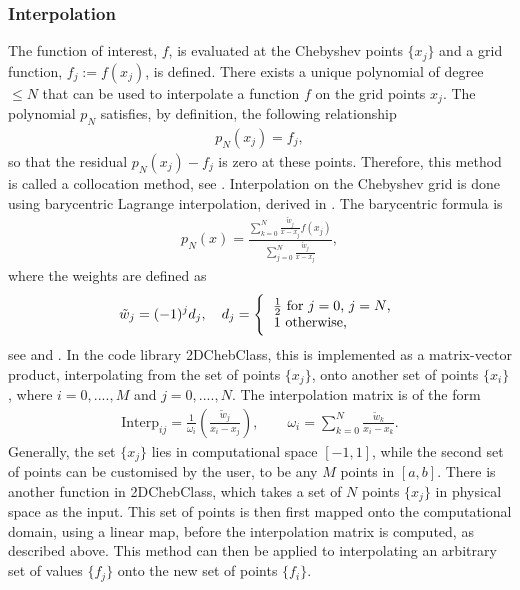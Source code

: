 \documentclass[11pt, a4paper]{article}
\theoremstyle{definition}
\begin{document}
\subsubsection{Interpolation}
The function of interest, $f$, is evaluated at the Chebyshev points $\{x_j\}$ and a grid function, $f_j := f(x_j)$, is defined. There exists a unique polynomial of degree $\leq N$ that can be used to interpolate a function $f$ on the grid points $x_j$. The polynomial $p_N$ satisfies, by definition, the following relationship
\begin{align}\label{eqnptov1}
	p_N(x_j)=f_j,
\end{align}
so that the residual $p_N(x_j) -f_j$ is zero at these points. Therefore, this method is called a collocation method, see \cite{Boyd1}. Interpolation on the Chebyshev grid is done using barycentric Lagrange interpolation, derived in \cite{bibTrefethenBerrut1}. The barycentric formula is
\begin{align*}
	p_N(x)= \frac{\displaystyle \sum_{k=0}^N \frac{\tilde w_j}{x-x_j}f(x_j)}{\displaystyle \sum_{j=0}^N \frac{\tilde w_j}{x-x_j}},
\end{align*}
where the weights are defined as
\begin{align*}
	\tilde w_j = (-1)^j d_j, \quad d_j = 
	\left \{
	\begin{tabular}{c}
		$\frac{1}{2}$ \text{for} $j=0$, $j=N$, \\
		$1$ \text{otherwise}, \phantom{abksla} 
	\end{tabular}
	\right .
\end{align*}
see \cite{bibTrefethenBerrut1} and \cite{GoddardPseudospectralCode1}. In the code library 2DChebClass, this is implemented as a matrix-vector product, interpolating from the set of points $\{x_j\}$, onto another set of points $\{x_i\}$, where $i = 0,...., M$ and $j = 0, ...., N$.  The interpolation matrix is of the form
\begin{align*}
	\text{Interp}_{ij} = \frac{1}{\omega_i} \left(\frac{\tilde w_j}{x_i-x_j}\right), \qquad \omega_i = \displaystyle \sum_{k=0}^N \frac{\tilde w_k}{x_i-x_k}.
\end{align*} 
Generally, the set $\{x_j\}$ lies in computational space $[-1,1]$, while the second set of points can be customised by the user, to be any $M$ points in $[a,b]$. There is another function in 2DChebClass, which takes a set of $N$ points $\{x_j\}$ in physical space as the input. This set of points is then first mapped onto the computational domain, using a linear map, before the interpolation matrix is computed, as described above. This method can then be applied to interpolating an arbitrary set of values $\{f_j\}$ onto the new set of points $\{f_i\}$. 
\end{document}
